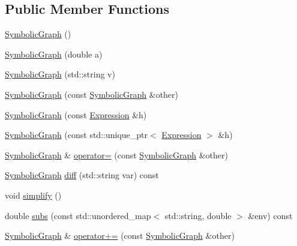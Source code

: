 \subsection*{Public Member Functions}
\begin{DoxyCompactItemize}
\item 
\mbox{\hyperlink{classsymcpp_1_1SymbolicGraph_a204812fa110d379566114bf1735014d6}{Symbolic\+Graph}} ()
\item 
\mbox{\hyperlink{classsymcpp_1_1SymbolicGraph_aefdb7d74dcdb35fb6f7830d818e49fa9}{Symbolic\+Graph}} (double a)
\item 
\mbox{\hyperlink{classsymcpp_1_1SymbolicGraph_a8fd6217f7ce8d29a6aa81d60f8b2b026}{Symbolic\+Graph}} (std\+::string v)
\item 
\mbox{\hyperlink{classsymcpp_1_1SymbolicGraph_a4f04dca2574225bd433548d898346b50}{Symbolic\+Graph}} (const \mbox{\hyperlink{classsymcpp_1_1SymbolicGraph}{Symbolic\+Graph}} \&other)
\item 
\mbox{\hyperlink{classsymcpp_1_1SymbolicGraph_ab2f4fbb7e3cec74693e45ca6b1d27f68}{Symbolic\+Graph}} (const \mbox{\hyperlink{classsymcpp_1_1Expression}{Expression}} \&h)
\item 
\mbox{\hyperlink{classsymcpp_1_1SymbolicGraph_a42eb5be99f0c64564397be67764df5f7}{Symbolic\+Graph}} (const std\+::unique\+\_\+ptr$<$ \mbox{\hyperlink{classsymcpp_1_1Expression}{Expression}} $>$ \&h)
\item 
\mbox{\hyperlink{classsymcpp_1_1SymbolicGraph}{Symbolic\+Graph}} \& \mbox{\hyperlink{classsymcpp_1_1SymbolicGraph_a3998d4b2e6276d0c9df756fe559c1bb8}{operator=}} (const \mbox{\hyperlink{classsymcpp_1_1SymbolicGraph}{Symbolic\+Graph}} \&other)
\item 
\mbox{\hyperlink{classsymcpp_1_1SymbolicGraph}{Symbolic\+Graph}} \mbox{\hyperlink{classsymcpp_1_1SymbolicGraph_a6f2f531206034592759502fe2bf6537f}{diff}} (std\+::string var) const
\item 
void \mbox{\hyperlink{classsymcpp_1_1SymbolicGraph_a1dd59d66d6015e65a8c3188d452543e3}{simplify}} ()
\item 
double \mbox{\hyperlink{classsymcpp_1_1SymbolicGraph_a89fa31b12b4765fdc24e9cc87cc48742}{subs}} (const std\+::unordered\+\_\+map$<$ std\+::string, double $>$ \&env) const
\item 
\mbox{\hyperlink{classsymcpp_1_1SymbolicGraph}{Symbolic\+Graph}} \& \mbox{\hyperlink{classsymcpp_1_1SymbolicGraph_a9db383e72ce51ecfb967fff84d5a3723}{operator+=}} (const \mbox{\hyperlink{classsymcpp_1_1SymbolicGraph}{Symbolic\+Graph}} \&other)
\item 

\end{DoxyCompactItemize}
